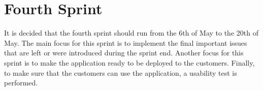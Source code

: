 \chapter{Fourth Sprint}
It is decided that the fourth sprint should run from the 6th of May to the 20th of May.
The main focus for this sprint is to implement the final important issues that are left or were introduced during the sprint end.
Another focus for this sprint is to make the application ready to be deployed to the customers.
Finally, to make sure that the customers can use the application, a usability test is performed.





